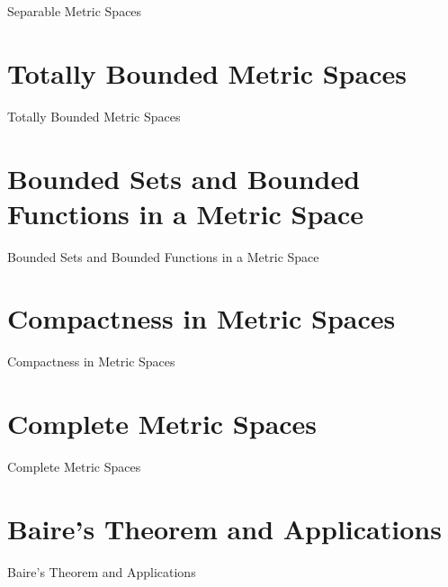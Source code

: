 Separable Metric Spaces

\section{Totally Bounded Metric Spaces}
\label{sec:totally-bounded-metric-spaces}

Totally Bounded Metric Spaces

\section{Bounded Sets and Bounded Functions in a Metric Space}
\label{sec:bounded-sets-and-bounded-functions-in-a-metric-space}

Bounded Sets and Bounded Functions in a Metric Space

\section{Compactness in Metric Spaces}
\label{sec:compactness-in-metric-spaces}

Compactness in Metric Spaces

\section{Complete Metric Spaces}
\label{sec:complete-metric-spaces}

Complete Metric Spaces

\section{Baire's Theorem and Applications}
\label{sec:baire-s-theorem-and-applications}

Baire's Theorem and Applications

